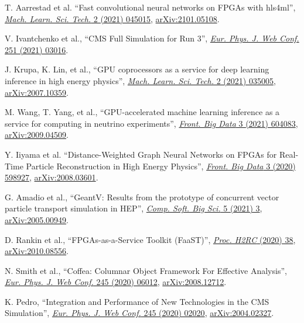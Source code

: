 \begin{description}[leftmargin=12pt,font=\normalfont,labelsep=0em]
\item T. Aarrestad et al. ``Fast convolutional neural networks on FPGAs with hls4ml'', \href{https://doi.org/10.1088/2632-2153/ac0ea1}{\emph{Mach. Learn. Sci. Tech.} 2 (2021) 045015}, \href{https://arxiv.org/abs/2101.05108}{arXiv:2101.05108}. %
\item V. Ivantchenko et al., ``CMS Full Simulation for Run 3'', \href{https://doi.org/10.1051/epjconf/202125103016}{\emph{Eur. Phys. J. Web Conf.} 251 (2021) 03016}. %
\item J. Krupa, K. Lin, et al., ``GPU coprocessors as a service for deep learning inference in high energy physics'', \href{https://doi.org/10.1088/2632-2153/abec21}{\emph{Mach. Learn. Sci. Tech.} 2 (2021) 035005}, \href{https://arxiv.org/abs/2007.10359}{arXiv:2007.10359}. %
\item M. Wang, T. Yang, et al., ``GPU-accelerated machine learning inference as a service for computing in neutrino experiments'', \href{https://doi.org/10.3389/fdata.2020.604083}{\emph{Front. Big Data} 3 (2021) 604083}, \href{https://arxiv.org/abs/2009.04509}{arXiv:2009.04509}. %
\item Y. Iiyama et al. ``Distance-Weighted Graph Neural Networks on FPGAs for Real-Time Particle Reconstruction in High Energy Physics'', \href{https://doi.org/10.3389/fdata.2020.598927}{\emph{Front. Big Data} 3 (2020) 598927}, \href{https://arxiv.org/abs/2008.03601}{arXiv:2008.03601}. %
\item \begin{sloppypar}G. Amadio et al., ``GeantV: Results from the prototype of concurrent vector particle transport simulation in HEP'', \href{https://doi.org/10.1007/s41781-020-00048-6}{\emph{Comp. Soft. Big Sci.} 5 (2021) 3}, \href{https://arxiv.org/abs/2005.00949}{arXiv:2005.00949}.\end{sloppypar} %
\item D. Rankin et al., ``FPGAs-as-a-Service Toolkit (FaaST)'', \href{https://doi.ieeecomputersociety.org/10.1109/H2RC51942.2020.00010}{\emph{Proc. H2RC} (2020) 38}, \href{https://arxiv.org/abs/2010.08556}{arXiv:2010.08556}. %
\item N. Smith et al., ``Coffea: Columnar Object Framework For Effective Analysis'', \href{https://doi.org/10.1051/epjconf/202024506012}{\emph{Eur. Phys. J. Web Conf.} 245 (2020) 06012}, \href{https://arxiv.org/abs/2008.12712}{arXiv:2008.12712}. %
\item K. Pedro, ``Integration and Performance of New Technologies in the CMS Simulation'', \href{https://doi.org/10.1051/epjconf/202024502020}{\emph{Eur. Phys. J. Web Conf.} 245 (2020) 02020}, \href{https://arxiv.org/abs/2004.02327}{arXiv:2004.02327}. %

\end{description}
